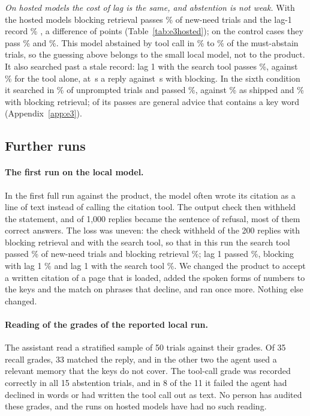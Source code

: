 \documentclass[10pt]{article}
\begin{document}
\emph{On hosted models the cost of lag is the same, and abstention is not weak.} With the hosted models blocking retrieval passes \KHRecBlock\% \KHRecBlockCI{} of new-need trials and the lag-1 record \KHRecLag\% \KHRecLagCI{}, a difference of \KHDiffBlockLag{} points \KHDiffBlockLagCI{} (Table~\ref{tab:e3hosted}); on the control cases they pass \KHCarryBlock\% and \KHCarryLag\%. This model abstained by tool call in \KHAbstToolMin\% to \KHAbstToolMax\% of the must-abstain trials, so the guessing above belongs to the small local model, not to the product. It also searched past a stale record: lag 1 with the search tool passes \KHRecHyb\%, against \KHRecTool\% for the tool alone, at \KHPathHyb\,s a reply against \KHPathBlock\,s with blocking. In the sixth condition it searched in \KHBringSrchUnp\% of unprompted trials and passed \KHBringUnp\%, against \KHUnpTool\% as shipped and \KHUnpBlock\% with blocking retrieval; \KHBringUnpLoose{} of its \KHBringUnpPassed{} passes are general advice that contains a key word (Appendix~\ref{app:e3}).

\subsection{Further runs}
\label{app:e3runs}

\paragraph{The first run on the local model.} In the first full run against the product, the model often wrote its citation as a line of text instead of calling the citation tool. The output check then withheld the statement, and \KfTemplated{} of 1,000 replies became the sentence of refusal, most of them correct answers. The loss was uneven: the check withheld \KfTmplBlock{} of the 200 replies with blocking retrieval and \KfTmplTool{} with the search tool, so that in this run the search tool passed \KfRecTool\% of new-need trials and blocking retrieval \KfRecBlock\%; lag 1 passed \KfRecLag\%, blocking with lag 1 \KfRecBoth\% and lag 1 with the search tool \KfRecHyb\%. We changed the product to accept a written citation of a page that is loaded, added the spoken forms of numbers to the keys and the match on phrases that decline, and ran once more. Nothing else changed.

\paragraph{Reading of the grades of the reported local run.} The assistant read a stratified sample of 50 trials against their grades. Of 35 recall grades, 33 matched the reply, and in the other two the agent used a relevant memory that the keys do not cover. The tool-call grade was recorded correctly in all 15 abstention trials, and in 8 of the 11 it failed the agent had declined in words or had written the tool call out as text. No person has audited these grades, and the runs on hosted models have had no such reading.
\end{document}
